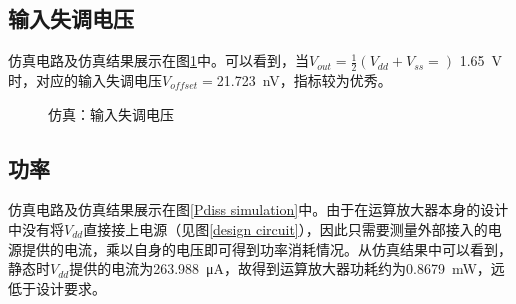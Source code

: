 \documentclass[UTF8]{ctexart}
\numberwithin{figure}{subsection}
\numberwithin{table}{subsection}
\numberwithin{equation}{subsection}
\begin{document}
\subsection{输入失调电压}
仿真电路及仿真结果展示在图\ref{Voff simulation}中。可以看到，当\(V_{out} = \frac{1}{2}\left(V_{dd} + V_{ss} = \right)\) \SI[]{1.65}{\volt}时，对应的输入失调电压\(V_{offset} = \)\SI[]{21.723}{\nano\volt}，指标较为优秀。

\begin{figure}[H]
    \centering
    \caption{仿真：输入失调电压}
    \label{Voff simulation}
\end{figure}

\subsection{功率}
仿真电路及仿真结果展示在图\ref{Pdiss simulation}中。由于在运算放大器本身的设计中没有将\(V_{dd}\)直接接上电源（见图\ref{design circuit}），因此只需要测量外部接入的电源提供的电流，乘以自身的电压即可得到功率消耗情况。从仿真结果中可以看到，静态时\(V_{dd}\)提供的电流为\SI[]{263.988}{\micro\ampere}，故得到运算放大器功耗约为\SI[]{0.8679}{\milli\watt}，远低于设计要求。
\end{document}

